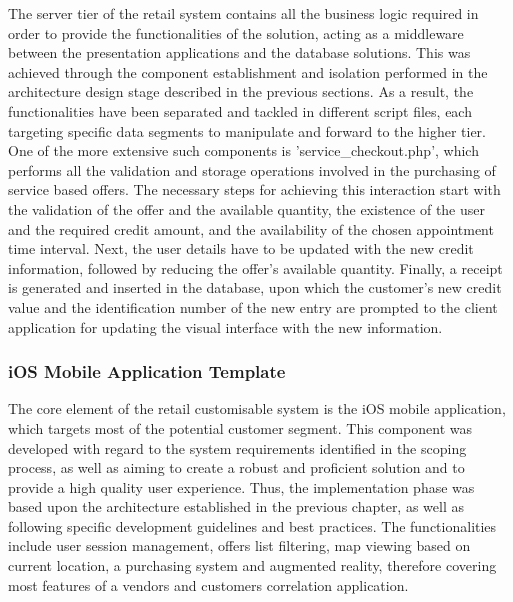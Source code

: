 The server tier of the retail system contains all the business logic required in order to provide the functionalities of the solution, acting as a middleware between the presentation applications and the database solutions. This was achieved through the component establishment and isolation performed in the architecture design stage described in the previous sections. As a result, the functionalities have been separated and tackled in different script files, each targeting specific data segments to manipulate and forward to the higher tier. One of the more extensive such components is 'service\_checkout.php', which performs all the validation and storage operations involved in the purchasing of service based offers. The necessary steps for achieving this interaction start with the validation of the offer and the available quantity, the existence of the user and the required credit amount, and the availability of the chosen appointment time interval. Next, the user details have to be updated with the new credit information, followed by reducing the offer's available quantity. Finally, a receipt is generated and inserted in the database, upon which the customer's new credit value and the identification number of the new entry are prompted to the client application for updating the visual interface with the new information. 

\subsubsection{iOS Mobile Application Template}

The core element of the retail customisable system is the iOS mobile application, which targets most of the potential customer segment. This component was developed with regard to the system requirements identified in the scoping process, as well as aiming to create a robust and proficient solution and to provide a high quality user experience. Thus, the implementation phase was based upon the architecture established in the previous chapter, as well as following specific development guidelines and best practices. The functionalities include user session management, offers list filtering, map viewing based on current location, a purchasing system and augmented reality, therefore covering most features of a vendors and customers correlation application.\\

